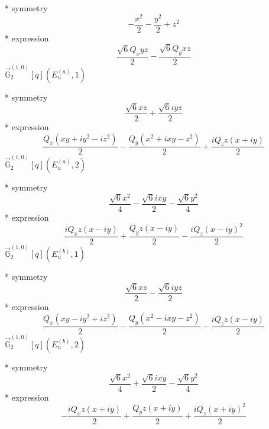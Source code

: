 \documentclass[fleqn,8pt]{jsarticle}
\begin{document}
\noindent\quad ** symmetry
\begin{dmath*}
- \frac{x^{2}}{2} - \frac{y^{2}}{2} + z^{2}
\end{dmath*}
\noindent\quad ** expression
\begin{dmath*}
\frac{\sqrt{6} Q_{x} y z}{2} - \frac{\sqrt{6} Q_{y} x z}{2}
\end{dmath*}
\noindent\quad $\vec{\mathbb{G}}_{2}^{(1,0)}[q](E_{u}^{(a)},1)$

\noindent\quad ** symmetry
\begin{dmath*}
\frac{\sqrt{6} x z}{2} + \frac{\sqrt{6} i y z}{2}
\end{dmath*}
\noindent\quad ** expression
\begin{dmath*}
\frac{Q_{x} \left(x y + i y^{2} - i z^{2}\right)}{2} - \frac{Q_{y} \left(x^{2} + i x y - z^{2}\right)}{2} + \frac{i Q_{z} z \left(x + i y\right)}{2}
\end{dmath*}
\noindent\quad $\vec{\mathbb{G}}_{2}^{(1,0)}[q](E_{u}^{(a)},2)$

\noindent\quad ** symmetry
\begin{dmath*}
\frac{\sqrt{6} x^{2}}{4} - \frac{\sqrt{6} i x y}{2} - \frac{\sqrt{6} y^{2}}{4}
\end{dmath*}
\noindent\quad ** expression
\begin{dmath*}
\frac{i Q_{x} z \left(x - i y\right)}{2} + \frac{Q_{y} z \left(x - i y\right)}{2} - \frac{i Q_{z} \left(x - i y\right)^{2}}{2}
\end{dmath*}
\noindent\quad $\vec{\mathbb{G}}_{2}^{(1,0)}[q](E_{u}^{(b)},1)$

\noindent\quad ** symmetry
\begin{dmath*}
\frac{\sqrt{6} x z}{2} - \frac{\sqrt{6} i y z}{2}
\end{dmath*}
\noindent\quad ** expression
\begin{dmath*}
\frac{Q_{x} \left(x y - i y^{2} + i z^{2}\right)}{2} - \frac{Q_{y} \left(x^{2} - i x y - z^{2}\right)}{2} - \frac{i Q_{z} z \left(x - i y\right)}{2}
\end{dmath*}
\noindent\quad $\vec{\mathbb{G}}_{2}^{(1,0)}[q](E_{u}^{(b)},2)$

\noindent\quad ** symmetry
\begin{dmath*}
\frac{\sqrt{6} x^{2}}{4} + \frac{\sqrt{6} i x y}{2} - \frac{\sqrt{6} y^{2}}{4}
\end{dmath*}
\noindent\quad ** expression
\begin{dmath*}
- \frac{i Q_{x} z \left(x + i y\right)}{2} + \frac{Q_{y} z \left(x + i y\right)}{2} + \frac{i Q_{z} \left(x + i y\right)^{2}}{2}
\end{dmath*}
\end{document}

